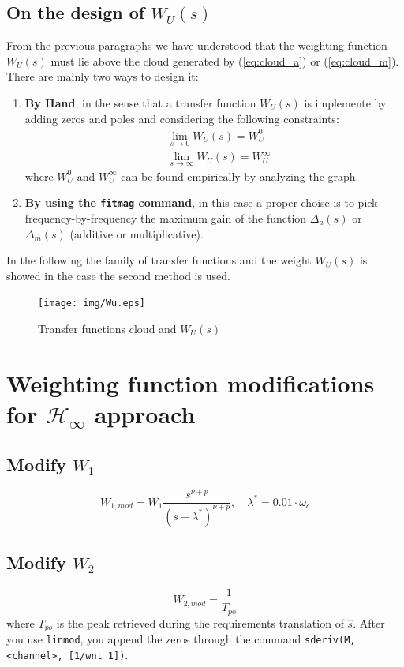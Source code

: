 \documentclass[a4paper, 12pt]{article}
\begin{document}
    \subsection{On the design of $W_U(s)$}
    From the previous paragraphs we have understood that the weighting function $W_U(s)$ must lie above the cloud generated by (\ref{eq:cloud_a}) or (\ref{eq:cloud_m}). There are mainly two ways to design it:
    \begin{enumerate}
        \itemsep-0.3em
        \item \textbf{By Hand}, in the sense that a transfer function $W_U(s)$ is implemente by adding zeros and poles and considering the following constraints:
        \begin{align}
            &\lim_{s\to{0}} W_U(s)=W_U^{0}\\
            &\lim_{s\to{\infty}} W_U(s)=W_U^{\infty}  
        \end{align}
        where $W_U^0$ and $W_U^\infty$ can be found empirically by analyzing the graph.
        \item \textbf{By using the \texttt{fitmag} command}, in this case a proper choise is to pick frequency-by-frequency the maximum gain of the function $\Delta_a(s)$ or $\Delta_m(s)$ (additive or multiplicative).
    \end{enumerate}
    In the following the family of transfer functions and the weight $W_U(s)$ is showed in the case the second method is used.

    \begin{figure}[h]
        \centering
        \texttt{[image: img/Wu.eps]}
        \caption{Transfer functions cloud and $W_U(s)$}
    \end{figure}

    \section{Weighting function modifications for $\mathcal{H}_\infty$ approach}

    \subsection{Modify $W_1$}
    \begin{equation}
        W_{1,mod}=W_1\frac{s^{\nu+p}}{(s+\lambda^*)^{\nu+p}}, 
        \quad \lambda^*=0.01\cdot\omega_c
    \end{equation}

    \subsection{Modify $W_2$}
    \begin{equation}
        W_{2,mod}=\frac{1}{T_{po}}
    \end{equation}
    where $T_{po}$ is the peak retrieved during the requirements translation of $\hat{s}$. After you use \texttt{linmod}, you append the zeros through the command \texttt{sderiv(M,<channel>, [1/wnt 1])}.


 
\end{document}

